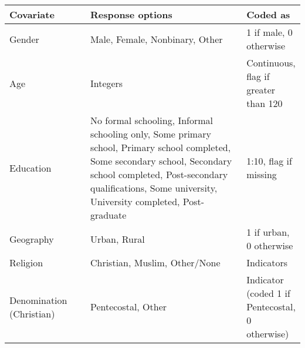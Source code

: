 \begin{table}[H]
\begin{adjustbox}{totalheight=.9\baselineskip, max width = \textwidth}
\begin{tabular}{p{0.3\linewidth}p{0.7\linewidth}p{0.25\linewidth}}
\textbf{Covariate}                   & \textbf{Response options} & \textbf{Coded as}                                     \\
\hline
Gender                                              & Male, Female, Nonbinary, Other                                                                                                                                                                                                      & 1 if male, 0 otherwise                                                                         \\
Age                                                 & Integers                                                                                                                                                                                                                            & Continuous, flag if greater than 120                                                           \\
Education                                           & No formal schooling, Informal schooling only, Some primary school, Primary school completed, Some secondary school, Secondary school completed, Post-secondary qualifications, Some university, University completed, Post-graduate & 1:10, flag if missing                                                                          \\
Geography                                           & Urban, Rural                                                                                                                                                                                                                        & 1 if urban, 0 otherwise                                                                        \\
Religion                                            & Christian, Muslim, Other/None                                                                                                                                                                                                       & Indicators                                                                                     \\
Denomination (Christian)                            & Pentecostal, Other                                                                                                                                                                                                                  & Indicator (coded 1 if Pentecostal, 0 otherwise)                                                \\

\end{tabular}
\end{adjustbox}
\end{table}
